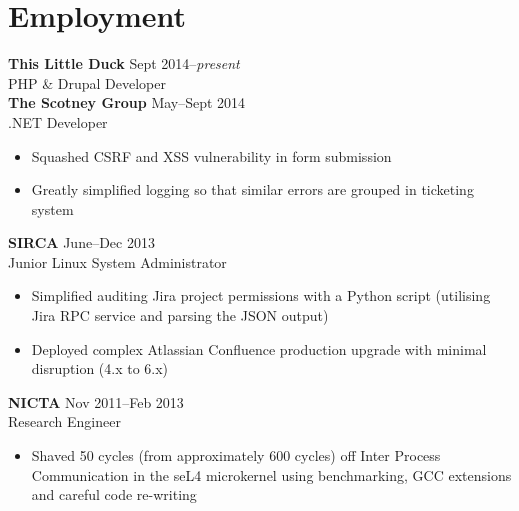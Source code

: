 
\vspace{-0.6cm}
\section*{Employment}
\vspace{-0.2cm}

\textbf{This Little Duck} \tabto{9.5cm} Sept 2014--\textit{present}\\
PHP \& Drupal Developer\\

\textbf{The Scotney Group} \tabto{9.5cm} May--Sept 2014\\
.NET Developer 
\begin{itemize}
\item Squashed CSRF and XSS vulnerability in form submission
\item Greatly simplified logging so that similar errors are grouped in 
ticketing system   
\end{itemize}

\textbf{SIRCA} \tabto{9.5cm} June--Dec 2013\\
Junior Linux System Administrator
\begin{itemize}
\item Simplified auditing Jira project permissions with a  
Python script (utilising Jira RPC service and parsing the JSON output)
\item Deployed complex Atlassian Confluence production 
upgrade with minimal disruption (4.x to 6.x)
\end{itemize}

\textbf{NICTA} \tabto{9.5cm} Nov 2011--Feb 2013\\
Research Engineer
\begin{itemize}
\item Shaved 50 cycles (from approximately 600 cycles) off
Inter Process Communication in the seL4 microkernel using benchmarking, GCC extensions 
and careful code re-writing
\end{itemize}




